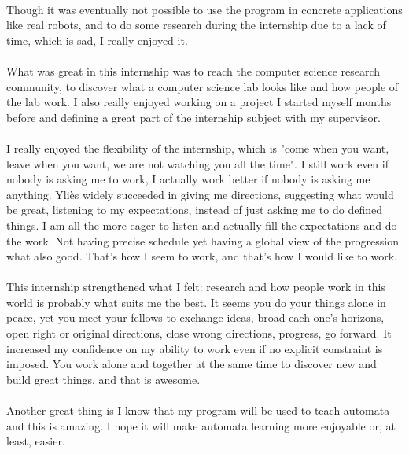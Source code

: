 \documentclass{article}
\begin{document}
\begin{sloppypar}
\paragraph{}
Though it was eventually not possible to use the program in concrete applications like real robots, and to do some research during the internship due to a lack of time, which is sad, I really enjoyed it.

   
\paragraph{}
What was great in this internship was to reach the computer science research community, to discover what a computer science lab looks like and how people of the lab work. I also really enjoyed working on a project I started myself months before and defining a great part of the internship subject with my supervisor.

   
\paragraph{}
I really enjoyed the flexibility of the internship, which is "come when you want, leave when you want, we are not watching you all the time". I still work even if nobody is asking me to work, I actually work better if nobody is asking me anything. Yliès widely succeeded in giving me directions, suggesting what would be great, listening to my expectations, instead of just asking me to do defined things. I am all the more eager to listen and actually fill the expectations and do the work. Not having precise schedule yet having a global view of the progression what also good. That's how I seem to work, and that's how I would like to work.

   
\paragraph{}
This internship strengthened what I felt: research and how people work in this world is probably what suits me the best. It seems you do your things alone in peace, yet you meet your fellows to exchange ideas, broad each one's horizons, open right or original directions, close  wrong directions, progress, go forward.
   It increased my confidence on my ability to work even if no explicit constraint is imposed. You work alone and together at the same time to discover new and build great things, and that is awesome.

   
\paragraph{}
Another great thing is I know that my program will be used to teach automata and this is amazing. I hope it will make automata learning more enjoyable or, at least, easier.
\end{sloppypar}
\end{document}
